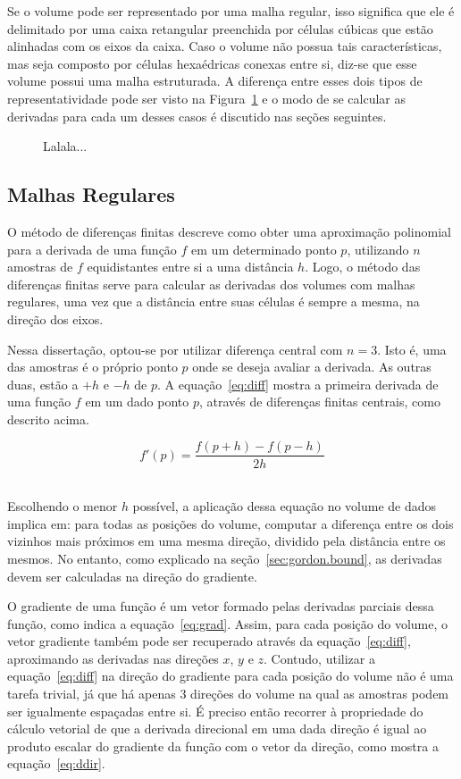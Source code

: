 	Se o volume pode ser representado por uma malha regular, isso significa que ele é delimitado por uma caixa retangular preenchida por células cúbicas que estão alinhadas com os eixos da caixa. Caso o volume não possua tais características, mas seja composto por células hexaédricas conexas entre si, diz-se que esse volume possui uma malha estruturada. A diferença entre esses dois tipos de representatividade pode ser visto na Figura~\ref{fig:meshes} e o modo de se calcular as derivadas para cada um desses casos é discutido nas seções seguintes.
	
\begin{figure}[h]
	\centering
	\label{fig:meshes}
	\caption{Lalala...}
\end{figure}
    
\subsection{Malhas Regulares}
\label{subsec:my.struct}
	O método de diferenças finitas descreve como obter uma aproximação polinomial para a derivada de uma função $ f $ em um determinado ponto $ p $, utilizando $ n $ amostras de $ f $ equidistantes entre si a uma distância $ h $. Logo, o método das diferenças finitas serve para calcular as derivadas dos volumes com malhas regulares, uma vez que a distância entre suas células é sempre a mesma, na direção dos eixos.
	
	Nessa dissertação, optou-se por utilizar diferença central com $ n = 3 $. Isto é, uma das amostras é o próprio ponto $ p $ onde se deseja avaliar a derivada. As outras duas, estão a $ +h $ e $ -h $ de $ p $. A equação~\eqref{eq:diff} mostra a primeira derivada de uma função $ f $ em um dado ponto $ p $, através de diferenças finitas centrais, como descrito acima.
	
\begin{equation}\label{eq:diff}
	f'(p) = \frac{f(p + h) - f(p - h)}{2h}
\end{equation} \

	Escolhendo o menor $ h $ possível, a aplicação dessa equação no volume de dados implica em: para todas as posições do volume, computar a diferença entre os dois vizinhos mais próximos em uma mesma direção, dividido pela distância entre os mesmos. No entanto, como explicado na seção~\ref{sec:gordon.bound}, as derivadas devem ser calculadas na direção do gradiente.
	
	O gradiente de uma função é um vetor formado pelas derivadas parciais dessa função, como indica a equação~\eqref{eq:grad}. Assim, para cada posição do volume, o vetor gradiente também pode ser recuperado através da equação~\eqref{eq:diff}, aproximando as derivadas nas direções $ x $, $ y $ e $ z $. Contudo, utilizar a equação~\eqref{eq:diff} na direção do gradiente para cada posição do volume não é uma tarefa trivial, já que há apenas 3 direções do volume na qual as amostras podem ser igualmente espaçadas entre si. É preciso então recorrer à propriedade do cálculo vetorial de que a derivada direcional em uma dada direção é igual ao produto escalar do gradiente da função com o vetor da direção, como mostra a equação~\eqref{eq:ddir}.
	

